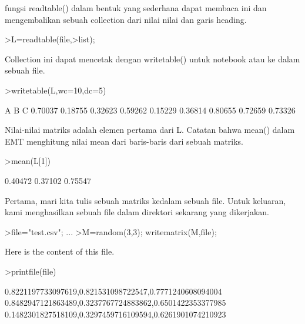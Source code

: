 \documentclass[a4paper,10pt]{article}
\begin{document}
\begin{eulernotebook}
\begin{eulercomment}
\begin{eulercomment}
\begin{eulercomment}
\begin{eulercomment}
\begin{eulercomment}
\begin{eulercomment}
\begin{euleroutput}
\end{euleroutput}
\begin{eulercomment}
fungsi readtable() dalam bentuk yang sederhana dapat membaca ini dan
mengembalikan sebuah collection dari nilai nilai dan garis heading.
\end{eulercomment}
\begin{eulerprompt}
>L=readtable(file,>list);
\end{eulerprompt}
\begin{eulercomment}
Collection ini dapat mencetak dengan writetable() untuk notebook atau
ke dalam sebuah file.
\end{eulercomment}
\begin{eulerprompt}
>writetable(L,wc=10,dc=5)
\end{eulerprompt}
\begin{euleroutput}
           A         B         C
     0.70037   0.18755   0.32623
     0.59262   0.15229   0.36814
     0.80655   0.72659   0.73326
\end{euleroutput}
\begin{eulercomment}
Nilai-nilai matriks adalah elemen pertama dari L. Catatan bahwa mean()
dalam EMT menghitung nilai mean dari baris-baris dari sebuah matriks.
\end{eulercomment}
\begin{eulerprompt}
>mean(L[1])
\end{eulerprompt}
\begin{euleroutput}
    0.40472 
    0.37102 
    0.75547 
\end{euleroutput}
\begin{eulercomment}
Pertama, mari kita tulis sebuah matriks kedalam sebuah file. Untuk
keluaran, kami menghasilkan sebuah file dalam direktori sekarang yang
dikerjakan.
\end{eulercomment}
\begin{eulerprompt}
>file="test.csv";  ...
>M=random(3,3); writematrix(M,file);
\end{eulerprompt}
\begin{eulercomment}
Here is the content of this file.
\end{eulercomment}
\begin{eulerprompt}
>printfile(file)
\end{eulerprompt}
\begin{euleroutput}
  0.8221197733097619,0.821531098722547,0.7771240608094004
  0.8482947121863489,0.3237767724883862,0.6501422353377985
  0.1482301827518109,0.3297459716109594,0.6261901074210923
  

\end{euleroutput}
\end{eulercomment}
\end{eulercomment}
\end{eulercomment}
\end{eulercomment}
\end{eulercomment}
\end{eulercomment}
\end{eulernotebook}
\end{document}
